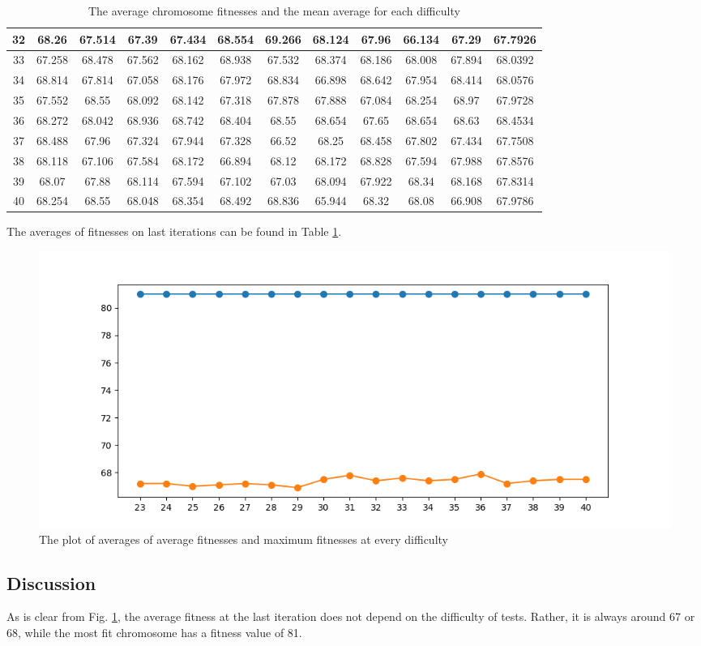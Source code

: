\documentclass[10pt]{article}
\begin{document}
\begin{table}[t]
\begin{center}
\begin{tabular}{|c|c|c|c|c|c|c|c|c|c|c|c|}
            32 & 68.26 & 67.514 & 67.39 & 67.434 & 68.554 & 69.266 & 68.124 & 67.96 & 66.134 & 67.29 & 67.7926\\\hline
            33 & 67.258 & 68.478 & 67.562 & 68.162 & 68.938 & 67.532 & 68.374 & 68.186 & 68.008 & 67.894 & 68.0392\\\hline
            34 & 68.814 & 67.814 & 67.058 & 68.176 & 67.972 & 68.834 & 66.898 & 68.642 & 67.954 & 68.414 & 68.0576\\\hline
            35 & 67.552 & 68.55 & 68.092 & 68.142 & 67.318 & 67.878 & 67.888 & 67.084 & 68.254 & 68.97 & 67.9728\\\hline
            36 & 68.272 & 68.042 & 68.936 & 68.742 & 68.404 & 68.55 & 68.654 & 67.65 & 68.654 & 68.63 & 68.4534\\\hline
            37 & 68.488 & 67.96 & 67.324 & 67.944 & 67.328 & 66.52 & 68.25 & 68.458 & 67.802 & 67.434 & 67.7508\\\hline
            38 & 68.118 & 67.106 & 67.584 & 68.172 & 66.894 & 68.12 & 68.172 & 68.828 & 67.594 & 67.988 & 67.8576\\\hline
            39 & 68.07 & 67.88 & 68.114 & 67.594 & 67.102 & 67.03 & 68.094 & 67.922 & 68.34 & 68.168 & 67.8314\\\hline
            40 & 68.254 & 68.55 & 68.048 & 68.354 & 68.492 & 68.836 & 65.944 & 68.32 & 68.08 & 66.908 & 67.9786\\\hline
        \end{tabular}
    \end{center}
    \caption{The average chromosome fitnesses and the mean average for each difficulty}\label{tableavg}
\end{table}

The averages of fitnesses on last iterations can be found in Table \ref{tableavg}.

\begin{figure}[t]
    \begin{center}
        \includegraphics[scale=0.6]{Figure_Plot.png}
    \end{center}
    \caption{The plot of averages of average fitnesses and maximum fitnesses at every difficulty}\label{figPlot}
\end{figure}

\subsection{Discussion}
As is clear from Fig. \ref{figPlot}, the average fitness at the last iteration
does not depend on the difficulty of tests. Rather, it is always around 67 or 68, while
the most fit chromosome has a fitness value of 81.
\end{document}
